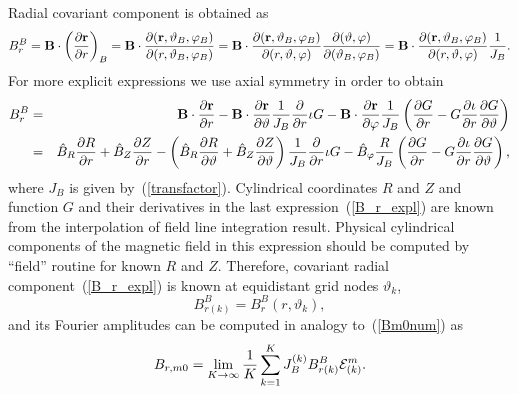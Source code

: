\documentclass[12pt]{article}
\newcommand{\be}[1]{\begin{equation} \label{#1}}
\newcommand{\ee}{\end{equation}}
\newcommand{\bea}[1]{\begin{eqnarray} \label{#1}}
\newcommand{\eea}{\end{eqnarray}}
\newcommand{\eq}[1]{(\ref{#1})}
\newcommand{\difp}[2]{\frac{\partial #1}{\partial #2}}
\newcommand{\br}{{\bf r}}
\newcommand{\bB}{{\bf B}}
\newcommand{\cE}{{\cal E}}
\begin{document}
\noindent
Radial covariant component is obtained as
\be{B_r}
B_r^B = \bB\cdot\left(\difp{\br}{r}\right)_B = \bB\cdot\difp{(\br,\vartheta_B,\varphi_B)}{(r,\vartheta_B,\varphi_B)}
= \bB\cdot\difp{(\br,\vartheta_B,\varphi_B)}{(r,\vartheta,\varphi)}\difp{(\vartheta,\varphi)}{(\vartheta_B,\varphi_B)}
= \bB\cdot\difp{(\br,\vartheta_B,\varphi_B)}{(r,\vartheta,\varphi)}\frac{1}{J_B}.
\ee
For more explicit expressions we use axial symmetry in order to obtain
\bea{B_r_expl}
B_r^B 
&=&
\bB\cdot\difp{\br}{r}-\bB\cdot\difp{\br}{\vartheta}\frac{1}{J_B}\difp{}{r}\iota G
-\bB\cdot\difp{\br}{\varphi}\frac{1}{J_B}\left(\difp{G}{r}-G\difp{\iota}{r}\difp{G}{\vartheta}\right)
\\
&=&
\hat B_R \difp{R}{r}+\hat B_Z \difp{Z}{r}
-\left(\hat B_R \difp{R}{\vartheta}+\hat B_Z \difp{Z}{\vartheta}\right)\frac{1}{J_B}\difp{}{r}\iota G
- \hat B_\varphi \frac{R}{J_B}\left(\difp{G}{r}-G\difp{\iota}{r}\difp{G}{\vartheta}\right),
\nonumber
\eea
where $J_B$ is given by~\eq{transfactor}. Cylindrical coordinates $R$ and $Z$ and function $G$ and their derivatives 
in the last expression~\eq{B_r_expl} are known from the interpolation of field line integration result. 
Physical cylindrical components of the magnetic field in this expression should be computed by ``field'' routine
for known $R$ and $Z$. Therefore, covariant radial component~\eq{B_r_expl} is known at equidistant grid
nodes $\vartheta_k$,
\be{B_r_nodes}
B_{r(k)}^B = B_r^B(r,\vartheta_k),
\ee
and its Fourier amplitudes can be computed in analogy to~\eq{Bm0num} as
\be{Brm0num}
B_{r,m0}=\lim_{K\rightarrow\infty}\frac{1}{K}\sum\limits_{k=1}^K J_B^{(k)} B_{r(k)}^B \cE_{(k)}^m.
\ee
\end{document}
